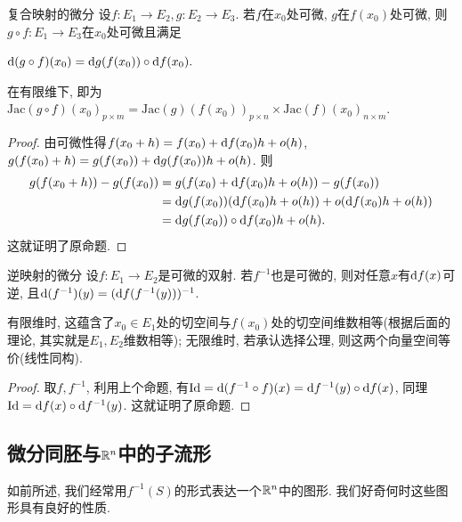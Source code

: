 \begin{proposition}{复合映射的微分}
	设$f:E _1 \to E _2,g:E _2 \to E _3$. 若$f$在$x_0$处可微, $g$在$f(x_0)$处可微, 则$g \circ f:E _1 \to E _3$在$x_0$处可微且满足
	\begin{center}
		$\displaystyle \mathop{}\!\mathrm{d} (g \circ f) (x_0) = \mathop{}\!\mathrm{d} g (f(x_0)) \circ \mathop{}\!\mathrm{d} f(x_0).$
	\end{center}
\end{proposition}
\begin{remark}
	在有限维下, 即为$\displaystyle \mathrm{Jac}(g \circ f)(x_0)_{p \times m} = \mathrm{Jac}(g)(f(x_0))_{p \times n} \times \mathrm{Jac}(f)(x_0)_{n \times m}$. 
\end{remark}
\begin{proof}
	由可微性得$f(x_0+h) = f(x_0) + \mathop{}\!\mathrm{d} f(x_0) h + o(h)$, $g(f(x_0)+h) = g(f(x_0)) + \mathop{}\!\mathrm{d} g(f(x_0)) h + o(h)$. 则
	\begin{align*}
		g(f(x_0+h))-g(f(x_0)) &= g(f(x_0) + \mathop{}\!\mathrm{d} f(x_0) h + o(h))-g(f(x_0)) \\
		&= \mathop{}\!\mathrm{d} g(f(x_0)) (\mathop{}\!\mathrm{d} f(x_0) h + o(h)) + o(\mathop{}\!\mathrm{d} f(x_0) h + o(h)) \\
		&= \mathop{}\!\mathrm{d} g (f(x_0)) \circ \mathop{}\!\mathrm{d} f(x_0) h + o(h).
	\end{align*}
	这就证明了原命题. 
\end{proof}

\begin{corollary}{逆映射的微分}
	设$f:E _1 \to E _2$是可微的双射. 若$f^{-1}$也是可微的, 则对任意$x$有$\mathop{}\!\mathrm{d} f(x)$可逆, 且$\mathop{}\!\mathrm{d} (f^{-1})(y) = (\mathop{}\!\mathrm{d} f (f^{-1}(y)))^{-1}$. 
\end{corollary}
\begin{remark}
	有限维时, 这蕴含了$x_0 \in E_1$处的切空间与$f(x_0)$处的切空间维数相等(根据后面的理论, 其实就是$E_1,E_2$维数相等); 无限维时, 若承认选择公理, 则这两个向量空间等价(线性同构). 
\end{remark}
\begin{proof}
	取$f,f^{-1}$, 利用上个命题, 有$\mathrm{Id} = \mathop{}\!\mathrm{d} (f^{-1} \circ f)(x) = \mathop{}\!\mathrm{d} f^{-1}(y) \circ \mathop{}\!\mathrm{d} f(x)$, 同理$\mathrm{Id} = \mathop{}\!\mathrm{d} f(x) \circ \mathop{}\!\mathrm{d} f^{-1}(y)$. 这就证明了原命题. 
\end{proof}



\subsection{微分同胚与$\mathbb{R} ^n$中的子流形}

如前所述, 我们经常用$f^{-1}(S)$的形式表达一个$\mathbb{R} ^n$中的图形. 我们好奇何时这些图形具有良好的性质. 

